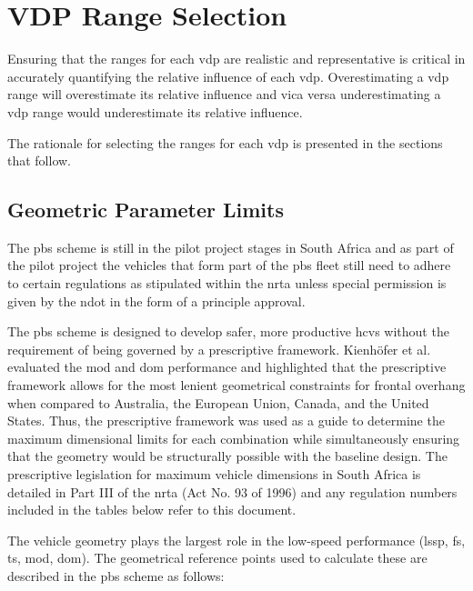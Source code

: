 \chapter{VDP Range Selection}\label{chapter:parameter-range-selection}

Ensuring that the ranges for each \gls{vdp} are realistic and representative is critical in accurately quantifying the relative influence of each \gls{vdp}. Overestimating a \gls{vdp} range will overestimate its relative influence and vica versa underestimating a \gls{vdp} range would underestimate its relative influence.

The rationale for selecting the ranges for each \gls{vdp} is presented in the sections that follow.

\section{Geometric Parameter Limits}\label{section:geometric-limits}

The \gls{pbs} scheme is still in the pilot project stages in South Africa and as part of the pilot project the vehicles that form part of the \gls{pbs} fleet still need to adhere to certain regulations as stipulated within the \gls{nrta} unless special permission is given by the \gls{ndot} in the form of a principle approval.

The \gls{pbs} scheme is designed to develop safer, more productive \glspl{hcv} without the requirement of being governed by a prescriptive framework. Kienh{\"o}fer et al. \cite{Kienhofer2014} evaluated the \gls{mod} and \gls{dom} performance and highlighted that the prescriptive framework allows for the most lenient geometrical constraints for frontal overhang when compared to Australia, the European Union, Canada, and the United States. Thus, the prescriptive framework was used as a guide to determine the maximum dimensional limits for each combination while simultaneously ensuring that the geometry would be structurally possible with the baseline design. The prescriptive legislation for maximum vehicle dimensions in South Africa is detailed in Part III of the \gls{nrta} (Act No. 93 of 1996) \cite{NationalDepartmentofTransport2003} and any regulation numbers included in the tables below refer to this document.

The vehicle geometry plays the largest role in the low-speed performance (\gls{lssp}, \gls{fs}, \gls{ts}, \gls{mod}, \gls{dom}). The geometrical reference points used to calculate these are described in the \gls{pbs} scheme \cite{NationalTransportCommission2008} as follows:

